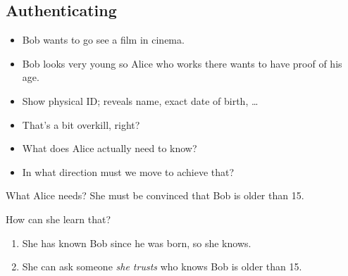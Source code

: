 \subsection{Authenticating}

\begin{frame}
  \begin{example}
    \begin{itemize}
      \item Bob wants to go see a film in cinema.
      \item Bob looks very young so Alice who works there wants to have proof 
        of his age.

        \pause

      \item Show physical ID; reveals name, exact date of birth, \dots
    \end{itemize}
  \end{example}

  \pause

  \begin{exercise}
    \begin{itemize}
      \item That's a bit overkill, right?
      \item What does Alice actually need to know?
      \item In what direction must we move to achieve that?
    \end{itemize}
  \end{exercise}
\end{frame}

\begin{frame}
  \begin{block}{What Alice needs?}
    She must be convinced that Bob is older than 15.
  \end{block}

  \pause

  \begin{alertblock}{How can she learn that?}
    \begin{enumerate}
      \item She has known Bob since he was born, so she knows.

        \pause

      \item She can ask someone \emph{she trusts} who knows Bob is older than 
        15.
    \end{enumerate}
  \end{alertblock}
\end{frame}

